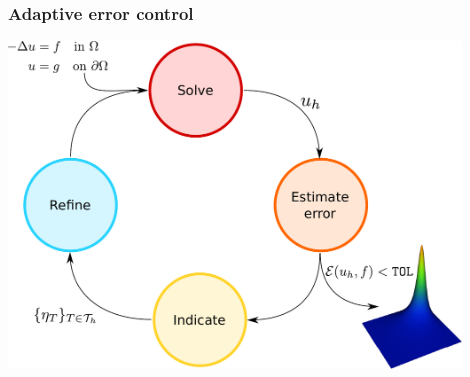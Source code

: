 \begin{frame}
  \frametitle{Adaptive error control}
  \begin{center}
    \includegraphics[width=0.9\textwidth]{pdf/h-adaptivity-workflow.pdf}
  \end{center}
\end{frame}
